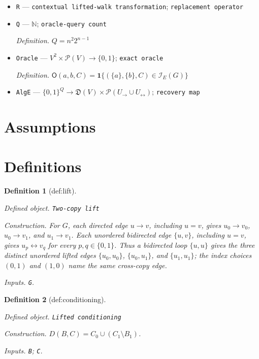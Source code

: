 \documentclass{article}
\newtheorem{definition}{Definition}
\begin{document}
\begin{itemize}
  \item \texttt{R} --- \texttt{contextual lifted-\allowbreak{}walk transformation}; \texttt{replacement operator}
  \item \texttt{Q} --- \(\mathbb N\); \texttt{oracle-\allowbreak{}query count}
  \par\smallskip\noindent\emph{Definition.} \(Q=n^2 2^{n-1}\)
  \item \texttt{Oracle} --- \(V^2\times\mathcal P(V)\to\{0,1\}\); \texttt{exact oracle}
  \par\smallskip\noindent\emph{Definition.} \(\mathsf O(a,b,C)=\mathbf 1\{(\{a\},\{b\},C)\in\mathcal I_E(G)\}\)
  \item \texttt{AlgE} --- \(\{0,1\}^{Q}\to\mathfrak D(V)\times\mathcal P(U_{\to}\cup U_{\leftrightarrow})\); \texttt{recovery map}
\end{itemize}

\section{Assumptions}

\section{Definitions}

\begin{definition}[def:lift]\label{def:lift}
\par\smallskip\noindent\emph{Defined object.} \texttt{Two-\allowbreak{}copy lift}
\par\smallskip\noindent\emph{Construction.} For \(G\), each directed edge \(u\to v\), including \(u=v\), gives \(u_0\to v_0\), \(u_0\to v_1\), and \(u_1\to v_1\). Each unordered bidirected edge \(\{u,v\}\), including \(u=v\), gives \(u_p\leftrightarrow v_q\) for every \(p,q\in\{0,1\}\). Thus a bidirected loop \(\{u,u\}\) gives the three distinct unordered lifted edges \(\{u_0,u_0\}\), \(\{u_0,u_1\}\), and \(\{u_1,u_1\}\); the index choices \((0,1)\) and \((1,0)\) name the same cross-copy edge.
\par\smallskip\noindent\emph{Inputs.} \texttt{G}.
\end{definition}

\begin{definition}[def:conditioning]\label{def:conditioning}
\par\smallskip\noindent\emph{Defined object.} \texttt{Lifted conditioning}
\par\smallskip\noindent\emph{Construction.} \(D(B,C)=C_0\cup(C_1\setminus B_1)\).
\par\smallskip\noindent\emph{Inputs.} \texttt{B}; \texttt{C}.
\end{definition}
\end{document}
